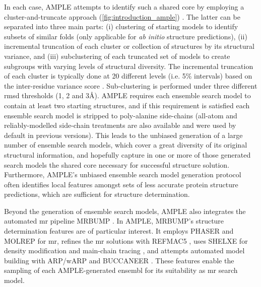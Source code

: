 In each case, AMPLE attempts to identify such a shared core by employing a cluster-and-truncate approach (\cref{fig:introduction_ample}) \cite{Bibby2012-lm}. The latter can be separated into three main parts: (i) clustering of starting models to identify subsets of similar folds (only applicable for \textit{ab initio} structure predictions), (ii) incremental truncation of each cluster or collection of structures by its structural variance, and (iii) subclustering of each truncated set of models to create subgroups with varying levels of structural diversity. The incremental truncation of each cluster is typically done at 20 different levels (i.e. 5\% intervals) based on the inter-residue variance score \cite{Theobald2006-qj}. Sub-clustering is performed under three different \gls{rmsd} thresholds (1, 2 and 3\AA). AMPLE requires each ensemble search model to contain at least two starting structures, and if this requirement is satisfied each ensemble search model is stripped to poly-alanine side-chains (all-atom and reliably-modelled side-chain \cite{Krivov2009-ex} treatments are also available and were used by default in previous versions). This leads to the unbiased generation of a large number of ensemble search models, which cover a great diversity of its original structural information, and hopefully capture in one or more of those generated search models the shared core necessary for successful structure solution. Furthermore, AMPLE's unbiased ensemble search model generation protocol often identifies local features amongst sets of less accurate  protein structure predictions, which are sufficient for structure determination. 

Beyond the generation of ensemble search models, AMPLE also integrates the automated \gls{mr} pipeline MRBUMP \cite{Keegan2018-kn}. In AMPLE, MRBUMP's structure determination features are of particular interest. It employs PHASER \cite{McCoy2007-mp} and MOLREP \cite{Vagin2010-ux} for \gls{mr}, refines the \gls{mr} solutions with REFMAC5 \cite{Murshudov2011-ww}, uses SHELXE for density modification and main-chain tracing \cite{Thorn2013-le}, and attempts automated model building with ARP/wARP \cite{Cohen2007-wg} and BUCCANEER \cite{Cowtan2006-xv}. These features enable the sampling of each AMPLE-generated ensembl for its suitability as \gls{mr} search model.

% 
%

